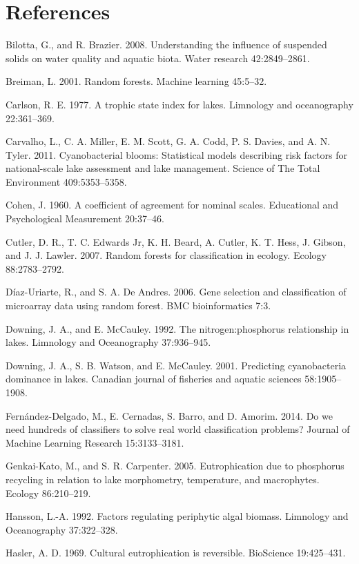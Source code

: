 \documentclass[12pt,]{article}
\begin{document}
\section*{References}\label{references}

Bilotta, G., and R. Brazier. 2008. Understanding the influence of
suspended solids on water quality and aquatic biota. Water research
42:2849--2861.

Breiman, L. 2001. Random forests. Machine learning 45:5--32.

Carlson, R. E. 1977. A trophic state index for lakes. Limnology and
oceanography 22:361--369.

Carvalho, L., C. A. Miller, E. M. Scott, G. A. Codd, P. S. Davies, and
A. N. Tyler. 2011. Cyanobacterial blooms: Statistical models describing
risk factors for national-scale lake assessment and lake management.
Science of The Total Environment 409:5353--5358.

Cohen, J. 1960. A coefficient of agreement for nominal scales.
Educational and Psychological Measurement 20:37--46.

Cutler, D. R., T. C. Edwards Jr, K. H. Beard, A. Cutler, K. T. Hess, J.
Gibson, and J. J. Lawler. 2007. Random forests for classification in
ecology. Ecology 88:2783--2792.

D{í}az-Uriarte, R., and S. A. De Andres. 2006. Gene selection and
classification of microarray data using random forest. BMC
bioinformatics 7:3.

Downing, J. A., and E. McCauley. 1992. The nitrogen:phosphorus
relationship in lakes. Limnology and Oceanography 37:936--945.

Downing, J. A., S. B. Watson, and E. McCauley. 2001. Predicting
cyanobacteria dominance in lakes. Canadian journal of fisheries and
aquatic sciences 58:1905--1908.

Fernández-Delgado, M., E. Cernadas, S. Barro, and D. Amorim. 2014. Do we
need hundreds of classifiers to solve real world classification
problems? Journal of Machine Learning Research 15:3133--3181.

Genkai-Kato, M., and S. R. Carpenter. 2005. Eutrophication due to
phosphorus recycling in relation to lake morphometry, temperature, and
macrophytes. Ecology 86:210--219.

Hansson, L.-A. 1992. Factors regulating periphytic algal biomass.
Limnology and Oceanography 37:322--328.

Hasler, A. D. 1969. Cultural eutrophication is reversible. BioScience
19:425--431.
\end{document}

